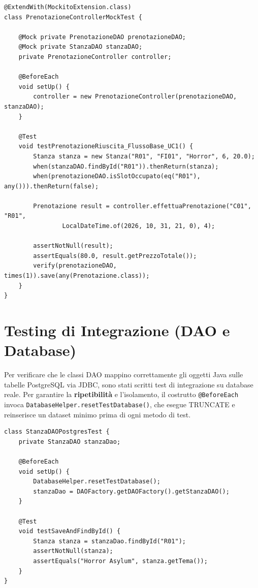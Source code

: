 \begin{lstlisting}[caption={Mock Test: flusso base UC1 con Mockito}, label={lst:test_mock}]
@ExtendWith(MockitoExtension.class)
class PrenotazioneControllerMockTest {

    @Mock private PrenotazioneDAO prenotazioneDAO;
    @Mock private StanzaDAO stanzaDAO;
    private PrenotazioneController controller;

    @BeforeEach
    void setUp() {
        controller = new PrenotazioneController(prenotazioneDAO, stanzaDAO);
    }

    @Test
    void testPrenotazioneRiuscita_FlussoBase_UC1() {
        Stanza stanza = new Stanza("R01", "FI01", "Horror", 6, 20.0);
        when(stanzaDAO.findById("R01")).thenReturn(stanza);
        when(prenotazioneDAO.isSlotOccupato(eq("R01"), any())).thenReturn(false);

        Prenotazione result = controller.effettuaPrenotazione("C01", "R01",
                LocalDateTime.of(2026, 10, 31, 21, 0), 4);

        assertNotNull(result);
        assertEquals(80.0, result.getPrezzoTotale());
        verify(prenotazioneDAO, times(1)).save(any(Prenotazione.class));
    }
}
\end{lstlisting}

\section{Testing di Integrazione (DAO e Database)}

Per verificare che le classi DAO mappino correttamente gli oggetti Java sulle tabelle PostgreSQL via JDBC, sono stati scritti test di integrazione su database reale.
Per garantire la \textbf{ripetibilità} e l'isolamento, il costrutto \texttt{@BeforeEach} invoca \texttt{DatabaseHelper.resetTestDatabase()}, che esegue TRUNCATE e reinserisce un dataset minimo prima di ogni metodo di test.

\begin{lstlisting}[caption={Integration Test per StanzaDAOPostgres con reset dello stato}, label={lst:test_dao}]
class StanzaDAOPostgresTest {
    private StanzaDAO stanzaDao;

    @BeforeEach
    void setUp() {
        DatabaseHelper.resetTestDatabase();
        stanzaDao = DAOFactory.getDAOFactory().getStanzaDAO();
    }

    @Test
    void testSaveAndFindById() {
        Stanza stanza = stanzaDao.findById("R01");
        assertNotNull(stanza);
        assertEquals("Horror Asylum", stanza.getTema());
    }
}
\end{lstlisting}

